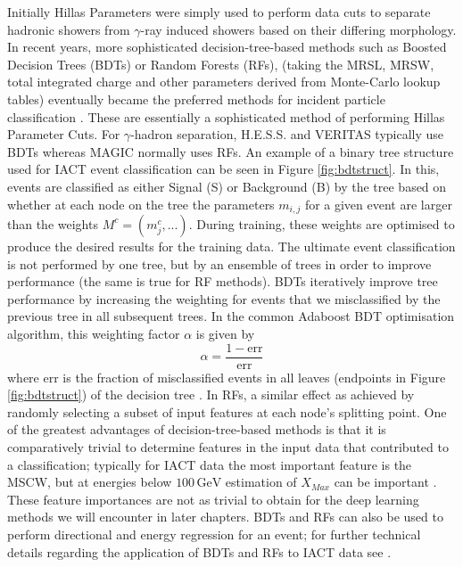 Initially Hillas Parameters were simply used to perform data cuts to separate hadronic showers from $\gamma$-ray induced showers based on their differing morphology. In recent years, more sophisticated decision-tree-based methods such as Boosted Decision Trees (BDTs) or Random Forests (RFs),  (taking the MRSL, MRSW, total integrated charge and other parameters derived from Monte-Carlo lookup tables) eventually became the preferred methods for incident particle classification \cite{hessbdt}. These are essentially a sophisticated method of performing Hillas Parameter Cuts. For $\gamma$-hadron separation, H.E.S.S. \cite{hessbdt} and VERITAS \cite{evdisp} typically use BDTs whereas MAGIC normally uses RFs. An example of a binary tree structure used for IACT event classification can be seen in Figure \ref{fig:bdtstruct}. In this, events are classified as either Signal (S) or Background (B) by the tree based on whether at each node on the tree the parameters $m_{i,j}$ for a given event are larger than the weights $M^c=(m^c_j,...)$. During training, these weights are optimised to produce the desired results for the training data. The ultimate event classification is not performed by one tree, but by  an ensemble of trees in order to improve performance (the same is true for RF methods). BDTs iteratively improve tree performance by increasing the weighting for events that we misclassified by the previous tree in all subsequent trees. In the common Adaboost BDT optimisation algorithm, this weighting factor $\alpha$ is given by 
\begin{equation}
    \alpha=\frac{1-\mathrm{err}}{\mathrm{err}}
\end{equation}
where $\mathrm{err}$ is the fraction of misclassified events in all leaves (endpoints in Figure \ref{fig:bdtstruct}) of the decision tree \cite{hessbdt}. In RFs, a similar effect as achieved by randomly selecting a subset of input features at each node’s splitting point. One of the greatest advantages of decision-tree-based methods is that it is comparatively trivial to determine features in the input data that contributed to a classification; typically for IACT data the most important feature is the MSCW, but at energies below $\mathrm{100\,GeV}$ estimation of $X_{Max}$ can be important \cite{hessbdt}. These feature importances are not as trivial to obtain for the deep learning methods we will encounter in later chapters. BDTs and RFs can also be used to perform directional and energy regression for an event; for further technical details regarding the application of BDTs and RFs to IACT data see \cite{Sitarek1i} \cite{magictime} \cite{hessbdt} \cite{supermagictime}.

